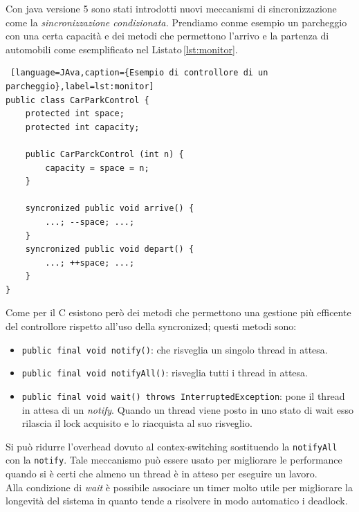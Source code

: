 Con java versione 5 sono stati introdotti nuovi meccanismi di sincronizzazione come la \emph{sincronizzazione condizionata.} Prendiamo conme esempio un parcheggio con una certa capacità e dei metodi che permettono l'arrivo e la partenza di automobili come esemplificato nel Listato\,\ref{lst:monitor}.
\begin{lstlisting} [language=JAva,caption={Esempio di controllore di un parcheggio},label=lst:monitor]
public class CarParkControl {
	protected int space;
	protected int capacity;
	
	public CarParckControl (int n) {
		capacity = space = n;
	}
	
	syncronized public void arrive() {
		...; --space; ...;
	}
	syncronized public void depart() {
		...; ++space; ...;
	}
}
\end{lstlisting}
Come per il C esistono però dei metodi che permettono una gestione più efficente del controllore rispetto all'uso della syncronized; questi metodi sono:
\begin{itemize}
\item \texttt{public final void notify()}: che risveglia un singolo thread in attesa.
\item \texttt{public final void notifyAll()}: risveglia tutti i thread in attesa.
\item \texttt{public final void wait() throws InterruptedException}: pone il thread in attesa di un \emph{notify}. Quando un thread viene posto in uno stato di wait esso rilascia il lock acquisito e lo riacquista al suo risveglio.
\end{itemize}

Si può ridurre l'overhead dovuto al contex-switching sostituendo la \texttt{notifyAll} con la \texttt{notify}. Tale meccanismo può essere usato per migliorare le performance quando si è certi che almeno un thread è in atteso per eseguire un lavoro.\\
Alla condizione di \emph{wait} è possibile associare un timer molto utile per migliorare la longevità del sistema in quanto tende a risolvere in modo automatico i deadlock.
